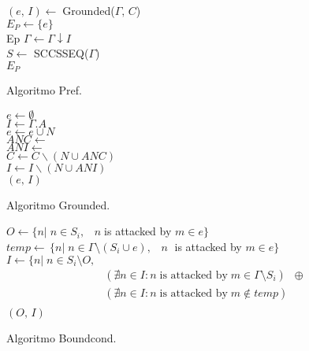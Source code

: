 \begin{algorithm}
	 \SetAlgoLined
	 $(e,\,I) \leftarrow \;$Grounded($\Gamma,\,C$) \\	
	 $E_P \leftarrow \{e\}$ \\
		{\Return Ep}
	$\Gamma \leftarrow \Gamma \downarrow I$ \\			
	$S \leftarrow$ SCCSSEQ($\Gamma$) \\
	\Return $E_P$
	\caption{Algoritmo Pref.}
\end{algorithm}
	
\begin{algorithm}
	\SetAlgoLined
	$e \leftarrow \emptyset$ \\
	$I \leftarrow \Gamma.A$ \\
	 { 
		$e \leftarrow e \cup N$ \\
		$ANC \leftarrow $ \\
		$ANI \leftarrow $ \\	
		$C \leftarrow C {\backslash} (N \cup ANC)$ \\
		$I \leftarrow I {\backslash} (N \cup ANI)$ \\
	}
	\Return $(e,\,I)$
	\caption{Algoritmo Grounded.}
\end{algorithm}

\begin{algorithm}
	\SetAlgoLined
	$O \leftarrow \{ n |\; n\in S_i,\;\;\; n \;$is attacked by $m \in e \} $ \\
	$temp \leftarrow\,\{ n |\; n \in\Gamma\setminus (S_i \cup e),\;\;\; n\;$ is attacked by $m \in e\}$ \\
	$I \leftarrow \{ n |\; n \in S_i\setminus O,$
		\begin{align*} %
		    (\nexists n \in I: n\; \textrm{is attacked by}\; m \in \Gamma\setminus S_i ) \;\; \oplus \\
		   	(\nexists n \in I: n\; \textrm{is attacked by}\; m \notin temp ) \\ 
		\end{align*}
	\Return $(O,\,I)$
	\caption{Algoritmo Boundcond.}
\end{algorithm}

